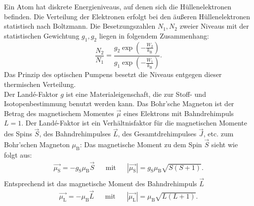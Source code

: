 %
Ein Atom hat diskrete Energieniveaus, auf denen sich die Hüllenelektronen befinden.
Die Verteilung der Elektronen erfolgt bei den äußeren Hüllenelektronen statistisch nach Boltzmann.
Die Besetzungszahlen $N_{1}, N_{2}$ zweier Niveaus mit der statistischen Gewichtung $g_{1}, g_{2}$ liegen in folgendem Zusammenhang:
\begin{equation*}
  \frac{N_{2}}{N_{1}} = \frac{ g_{2} \exp{  \left( -\frac{W_{2}}{k_{\text{B}}}  \right) }}{ g_{1} \exp{ \left( -\frac{W_{1}}{k_{\text{B}}} \right) }}.
\end{equation*}
Das Prinzip des optischen Pumpens besetzt die Niveaus entgegen dieser thermischen Verteilung.\\
%
%
Der Landé-Faktor $g$ ist eine Materialeigenschaft, die zur Stoff- und Isotopenbestimmung benutzt werden kann.
Das Bohr'sche Magneton ist der Betrag des magnetischem Momentes $\vec{\mu}$ eines Elektrons mit Bahndrehimpuls $L=1$.
Der Landé-Faktor ist ein Verhältnisfaktor für die magnetischen Momente des Spins $\vec{S}$, des Bahndrehimpulses $\vec{L}$, des Gesamtdrehimpulses $\vec{J}$, etc. zum Bohr'schen Magneton $\mu_{\text{B}}$:
Das magnetische Moment zu dem Spin $\vec{S}$ sieht wie folgt aus:
\begin{align*}
  \vec{\mu_{\text{S}}} = - g_{\text{S}} \mu_{\text{B}} \vec{S} && \text{mit} && |\vec{\mu_{\text{S}}}|= g_{\text{S}} \mu_{\text{B}} \sqrt{S(S+1)}.\\
\end{align*}
Entsprechend ist das magnetische Moment des Bahndrehimpuls $\vec{L}$
\begin{align*}
  \vec{\mu_{\text{L}}} = - \mu_{\text{B}} \vec{L} && \text{mit} && |\vec{\mu_{\text{L}}}|= \mu_{\text{B}} \sqrt{L(L+1)}.
\end{align*}
